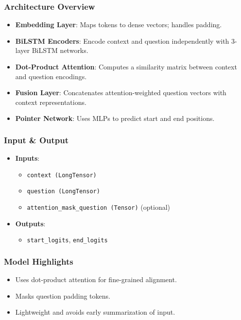 \documentclass[runningheads]{llncs}
\begin{document}
\subsubsection{Architecture Overview}
\begin{itemize}
    \item \textbf{Embedding Layer}: Maps tokens to dense vectors; handles padding.
    \item \textbf{BiLSTM Encoders}: Encode context and question independently with 3-layer BiLSTM networks.
    \item \textbf{Dot-Product Attention}: Computes a similarity matrix between context and question encodings.
    \item \textbf{Fusion Layer}: Concatenates attention-weighted question vectors with context representations.
    \item \textbf{Pointer Network}: Uses MLPs to predict start and end positions.
\end{itemize}

\subsubsection{Input \& Output}
\begin{itemize}
    \item \textbf{Inputs}:
    \begin{itemize}
        \item \texttt{context (LongTensor)}
        \item \texttt{question (LongTensor)}
        \item \texttt{attention\_mask\_question (Tensor)} (optional)
    \end{itemize}
    \item \textbf{Outputs}:
    \begin{itemize}
        \item \texttt{start\_logits}, \texttt{end\_logits}
    \end{itemize}
\end{itemize}

\subsubsection{Model Highlights}
\begin{itemize}
    \item Uses dot-product attention for fine-grained alignment.
    \item Masks question padding tokens.
    \item Lightweight and avoids early summarization of input.
\end{itemize}
\end{document}
